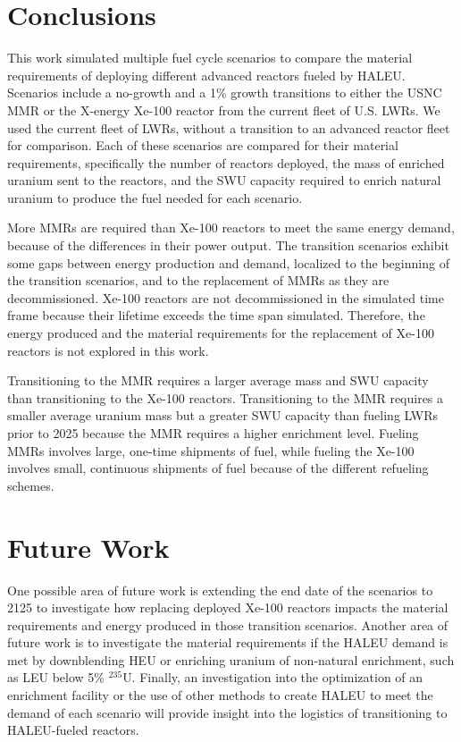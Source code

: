 \section{Conclusions}
This work simulated multiple fuel cycle scenarios to compare the 
material requirements of deploying different advanced reactors fueled 
by \gls{HALEU}. Scenarios include a no-growth and a 1\% growth 
transitions to either the \gls{USNC} \gls{MMR} or the X-energy Xe-100 
reactor from the current fleet of U.S. \glspl{LWR}. We used the current 
fleet of \glspl{LWR}, without a transition to an advanced reactor 
fleet for 
comparison. Each of these scenarios are compared for their material 
requirements, specifically the number of reactors deployed, the mass 
of enriched uranium sent to the reactors, and the \gls{SWU} capacity 
required to enrich natural uranium to produce the fuel needed for 
each scenario. 

More \glspl{MMR} are required than Xe-100 reactors to meet the same 
energy demand, because of the differences in their power output. 
The transition scenarios exhibit some gaps between  
energy production and demand, localized to the beginning of the 
transition
scenarios, and to the replacement of \glspl{MMR} as they are decommissioned. 
Xe-100 reactors are not decommissioned in the simulated time frame because 
their lifetime exceeds the time span simulated. Therefore, the 
energy produced and the material requirements for the replacement of 
Xe-100 reactors is not explored in this work. 

Transitioning to the \gls{MMR} requires 
a larger average mass and \gls{SWU} capacity than transitioning to the 
Xe-100 reactors. Transitioning to the \gls{MMR} requires a smaller average 
uranium mass but a greater \gls{SWU} capacity than fueling \glspl{LWR} prior 
to 2025 because the \gls{MMR} requires a higher enrichment level. 
Fueling \glspl{MMR} involves large, one-time shipments of fuel, while 
fueling the Xe-100 involves small, continuous shipments of fuel 
because of the different refueling schemes.

\section{Future Work}
One possible area of future work is extending the end date 
of the scenarios to 2125 to investigate how replacing deployed Xe-100 
reactors impacts the material requirements and energy produced in those 
transition scenarios. Another area of future work is to investigate the 
material requirements if the \gls{HALEU} demand is met by downblending 
\gls{HEU} or enriching uranium of non-natural enrichment, such as 
\gls{LEU} below 5\% $^{235}$U. Finally, an investigation into the 
optimization of an enrichment facility or the use of other methods to 
create \gls{HALEU} to meet the demand of each scenario will provide 
insight into the logistics of transitioning to \gls{HALEU}-fueled 
reactors. 
